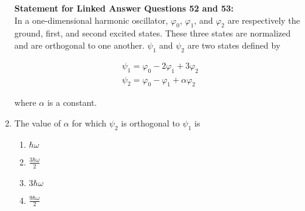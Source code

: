 \documentclass[journal]{IEEEtran}
\begin{document}
\begin{enumerate}
    \textbf{Statement for Linked Answer Questions 52 and 53:} \\
    In a one-dimensional harmonic oscillator, $\varphi_0$, $\varphi_1$, and $\varphi_2$ are respectively the
    ground, first, and second excited states. These three states are normalized and are orthogonal to one another.
    $\psi_1$ and $\psi_2$ are two states defined by

    \begin{align*}
    \psi_1 = \varphi_0 - 2\varphi_1 + 3\varphi_2 \\
    \psi_2 = \varphi_0 - \varphi_1 + \alpha\varphi_2
    \end{align*}

    where $\alpha$ is a constant.

    \item The value of $\alpha$ for which $\psi_2$ is orthogonal to $\psi_1$ is

    \begin{multicols}{4}
        \begin{enumerate}
            \item $\hbar\omega$
            \item $\frac{3\hbar\omega}{2}$
            \item $3\hbar\omega$
            \item $\frac{9\hbar\omega}{2}$
        \end{enumerate}
    \end{multicols}
\end{enumerate}
\end{document}
